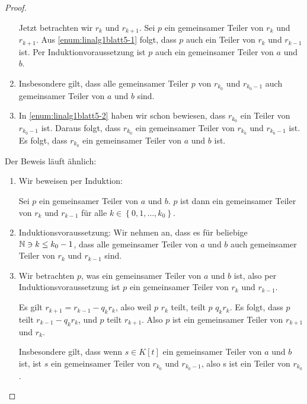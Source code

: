 \begin{proof}
\begin{parts}
\begin{enumerate}[label=(\roman*)]
	Jetzt betrachten wir $r_k$ und $r_{k+1}$. Sei $p$ ein gemeinsamer Teiler von $r_k$ und $r_{k+1}$. Aus \ref{enum:linalg1blatt5-1} folgt, dass $p$ auch ein Teiler von $r_k$ und $r_{k-1}$ ist. Per Induktionvoraussetzung ist $p$ auch ein gemeinsamer Teiler von $a$ und $b$.
\item Insbesondere gilt, dass alle gemeinsamer Teiler $p$ von $r_{k_0}$ und $r_{k_0-1}$ auch gemeinsamer Teiler von $a$ und $b$ sind. 
\item In \ref{enum:linalg1blatt5-2} haben wir schon bewiesen, dass $r_{k_0}$ ein Teiler von $r_{k_0-1}$ ist. Daraus folgt, dass $r_{k_0}$ ein gemeinsamer Teiler von $r_{k_0}$ und $r_{k_0-1}$ ist. Es folgt, dass $r_{k_0}$ ein gemeinsamer Teiler von $a$ und $b$ ist.
\end{enumerate}
\item Der Beweis läuft ähnlich:
\begin{enumerate}[label=(\roman*)]
	\item Wir beweisen per Induktion:
		\begin{tcolorbox}
			Sei $p$ ein gemeinsamer Teiler von $a$ und $b$. $p$ ist dann ein gemeinsamer Teiler von $r_k$ und $r_{k-1}$ f\"{u}r alle $k\in \left\{ 0,1,\dots, k_0 \right\} $.
		\end{tcolorbox}
	\item Induktionsvoraussetzung: Wir nehmen an, dass es f\"{u}r beliebige $\mathbb{N} \ni k \le k_0-1$, dass alle gemeinsamer Teiler von $a$ und $b$ auch gemeinsamer Teiler von $r_{k}$ und $r_{k-1}$ sind.
	\item Wir betrachten $p$, was ein gemeinsamer Teiler von $a$ und $b$ ist, also per Induktionsvoraussetzung ist $p$ ein gemeinsamer Teiler von $r_k$ und $r_{k-1}$. 

		Es gilt $r_{k+1}=r_{k-1}-q_kr_k$, also weil $p$ $r_k$ teilt, teilt $p$ $q_kr_k$. Es folgt, dass $p$ teilt $r_{k-1}-q_kr_k$, und $p$ teilt $r_{k+1}$. Also $p$ ist ein gemeinsamer Teiler von $r_{k+1}$ und $r_k$.

		Insbesondere gilt, dass wenn $s\in K[t]$ ein gemeinsamer Teiler von $a$ und $b$ ist, ist $s$ ein gemeinsamer Teiler von $r_{k_0}$ und $r_{k_0-1}$, also s ist ein Teiler von $r_{k_0}$.\qedhere
\end{enumerate}
	\end{parts}
\end{proof}
